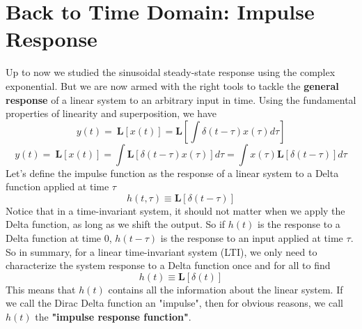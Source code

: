 \section{Back to Time Domain:  Impulse Response}
Up to now we studied the sinusoidal steady-state response using the complex exponential.  But we are now armed with the right tools to tackle the \textbf{general response} of a linear system to an arbitrary input in time.  Using the fundamental properties of linearity and superposition, we have
    \begin{equation}
        y\left(t\right)=\ \mathbf{L}\left[x\left(t\right)\right]=\mathbf{L}\left[\int\delta\left(t-\tau\right)x\left(\tau\right)d\tau\right]
    \end{equation}
    \begin{equation}
        y\left(t\right)=\ \mathbf{L}\left[x\left(t\right)\right]=\int \mathbf{L}\left[\delta\left(t-\tau\right)x\left(\tau\right)\right]d\tau= \int x\left(\tau\right)\mathbf{L}\left[\delta\left(t-\tau\right)\right]d\tau
    \end{equation}
Let's define the impulse function as the response of a linear system to a Delta function applied at time $\tau$
    \begin{equation}
        h(t,\tau) \equiv  \mathbf{L}[\delta(t-\tau)]
    \end{equation}
Notice that in a time-invariant system, it should not matter when we apply the Delta function, as long as we shift the output.  So if $h(t)$ is the response to a Delta function at time 0, $h(t-\tau)$ is the response to an input applied at time $\tau$.  So in summary, for a linear time-invariant system (LTI), we only need to characterize the system response to a Delta function once and for all to find
    \begin{equation}
        h(t) \equiv  \mathbf{L}[\delta(t)]
    \end{equation}
This means that $h(t)$ contains all the information about the linear system. If we call the Dirac Delta function an "impulse", then for obvious reasons, we call $h(t)$ the \textbf{"impulse response function"}. 
